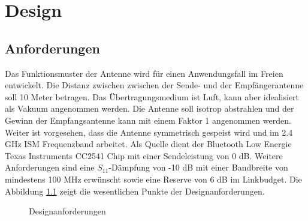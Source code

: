\newpage 
\chapter{Design}

\section{Anforderungen}
Das Funktionsmuster der Antenne wird für einen Anwendungsfall im Freien entwickelt. Die Distanz zwischen zwischen der Sende- und der Empfängerantenne soll 10 Meter betragen. Das Übertragungsmedium ist Luft, kann aber idealisiert als Vakuum angenommen werden. Die Antenne soll isotrop abstrahlen und der Gewinn der Empfangsantenne kann mit einem Faktor  1 angenommen werden. Weiter ist vorgesehen, dass die Antenne symmetrisch gespeist wird und im 2.4 GHz ISM Frequenzband arbeitet. Als Quelle dient der Bluetooth Low Energie Texas Instruments CC2541 Chip mit einer Sendeleistung von 0 dB. Weitere Anforderungen sind eine $S_{11}$-Dämpfung von -10 dB mit einer Bandbreite von mindestens 100 MHz erwünscht sowie eine Reserve von 6 dB im Linkbudget. Die Abbildung \ref{fig:DesignAusgangslage} zeigt die wesentlichen Punkte der Designanforderungen.

\begin{figure}[!ht]
\begin{center}
\end{center}
\caption{Designanforderungen}
\label{fig:DesignAusgangslage}
\end{figure}

